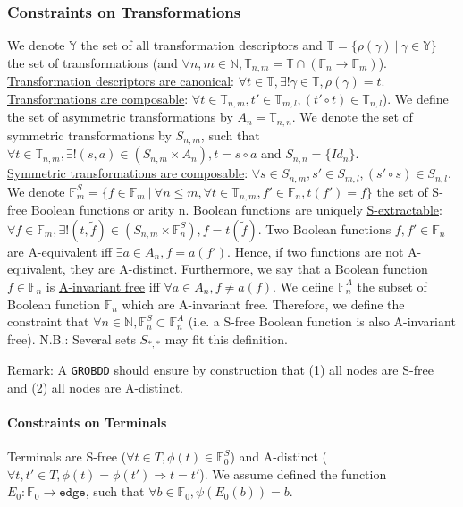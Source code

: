 \documentclass[a4paper,10pt]{article}
\newcommand{\N}{\mathbb{N}}%
\newcommand{\F}{\mathbb{F}}
\newcommand{\Y}{\mathbb{Y}}
\newcommand{\T}{\mathbb{T}}
\newcommand{\GroBdd}{\texttt{GROBDD}}
\begin{document}
\subsubsection{Constraints on Transformations}

We denote $\Y$ the set of all transformation descriptors and $\T=\{\rho(\gamma)~|~\gamma\in\Y\}$ the set of transformations (and $\forall n, m\in\N, \T_{n, m} = \T \cap (\F_n \longrightarrow \F_m)$).
\underline{Transformation descriptors are canonical}: $\forall t\in\T, \exists! \gamma\in\T, \rho(\gamma)=t$.\\
\underline{Transformations are composable}: $\forall t\in\T_{n, m}, t'\in\T_{m ,l}, (t' \circ t) \in \T_{n, l}$).
We define the set of asymmetric transformations by $A_n = \T_{n, n}$.
We denote the set of symmetric transformations by $S_{n, m}$, such that $\forall t\in\T_{n, m}, \exists!(s, a)\in(S_{n, m}\times A_n), t = s \circ a$ and $S_{n, n} = \{Id_n\}$.\\
\underline{Symmetric transformations are composable}: $\forall s\in S_{n, m}, s'\in S_{m ,l}, (s' \circ s) \in S_{n, l}$.
We denote $\F^S_m = \{f\in\F_m~|~\forall n \leq m, \forall t\in\T_{n, m}, f'\in\F_n, t(f') = f\}$ the set of S-free Boolean functions or arity n.
Boolean functions are uniquely \underline{S-extractable}: $\forall f\in\F_m, \exists! (t, \tilde{f})\in \left( S_{n, m} \times \F^S_n \right), f = t(\tilde{f})$.
Two Boolean functions $f, f'\in\F_n$ are \underline{A-equivalent} iff $\exists a\in A_n, f=a(f')$.
Hence, if two functions are not A-equivalent, they are \underline{A-distinct}.
Furthermore, we say that a Boolean function $f\in\F_n$ is \underline{A-invariant free} iff $\forall a\in A_n, f\neq a(f)$.
We define $\F^A_n$ the subset of Boolean function $\F_n$ which are A-invariant free.
Therefore, we define the constraint that $\forall n\in\N, \F^S_n \subset \F^A_n$ (i.e. a S-free Boolean function is also A-invariant free).
N.B.: Several sets $S_{*, *}$ may fit this definition.

Remark: A \GroBdd{} should ensure by construction that (1) all nodes are S-free and (2) all nodes are A-distinct.

\paragraph{Constraints on Terminals}
Terminals are S-free ($\forall t\in T, \phi(t)\in\F^S_0$) and A-distinct ($\forall t, t'\in T, \phi(t) = \phi(t') \Rightarrow t = t'$).
We assume defined the function $E_0 : \F_0 \longrightarrow \mathtt{edge}$, such that $\forall b\in\F_0, \psi(E_0(b)) = b$. 
\end{document}
